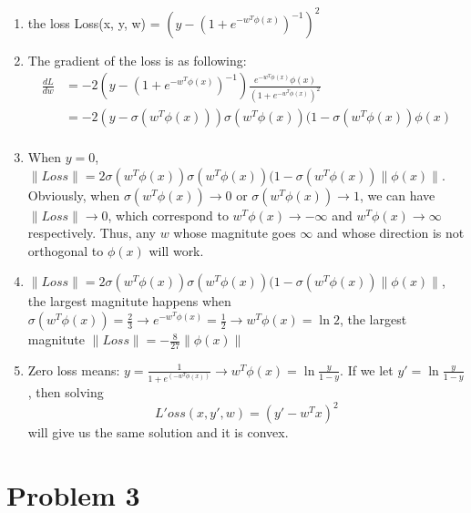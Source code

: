 \documentclass[12pt]{article}
\begin{document}
\begin{enumerate}[label=(\alph*)]
  \item the loss Loss(x, y, w) = $(y - (1+e^{-w^T\phi(x)})^{-1})^2$
   \item The gradient of the loss is as following:
\begin{align*}
\frac{d L}{d w} &= -2(y - (1+e^{-w^T\phi(x)})^{-1})\frac{e^{-w^T\phi(x)}\phi(x)}{ (1+e^{-w^T\phi(x)})^2}\\
& =  -2(y - \sigma(w^T\phi(x)))\sigma(w^T\phi(x))(1-\sigma(w^T\phi(x))\phi(x)\\
\end{align*}
\item When $y = 0$, $\|Loss\| = 2\sigma(w^T\phi(x))\sigma(w^T\phi(x))(1-\sigma(w^T\phi(x))\|\phi(x)\| $. Obviously, when $\sigma(w^T\phi(x)) \rightarrow 0$ or  $\sigma(w^T\phi(x)) \rightarrow 1$, we can have  $\|Loss\| \rightarrow 0$, which correspond to $w^T\phi(x) \rightarrow -\infty $ and $w^T\phi(x) \rightarrow \infty $ respectively. Thus, any $w$ whose magnitute goes $\infty$ and whose direction is not orthogonal to $\phi(x)$ will work.
\item  $\|Loss\| = 2\sigma(w^T\phi(x))\sigma(w^T\phi(x))(1-\sigma(w^T\phi(x))\|\phi(x)\| $, the largest magnitute happens when $\sigma(w^T\phi(x)) = \frac{2}{3}\rightarrow  e^{-w^T\phi(x)} = \frac{1}{2}\rightarrow w^T\phi(x) = \ln 2$, the largest magnitute $\|Loss\| = - \frac{8}{27}\|\phi(x)\| $
\item Zero loss means: $y = \frac{1}{1+e^{(-w^T\phi(x))}} \rightarrow w^T\phi(x) = \ln \frac{y}{1-y}$. If we let $y' = \ln \frac{y}{1-y}$, then solving
\[
L'oss(x, y',w) = (y' - w^Tx)^2
\]
will give us the same solution and it is convex.
\end{enumerate}

\section*{Problem 3}
\end{document}
